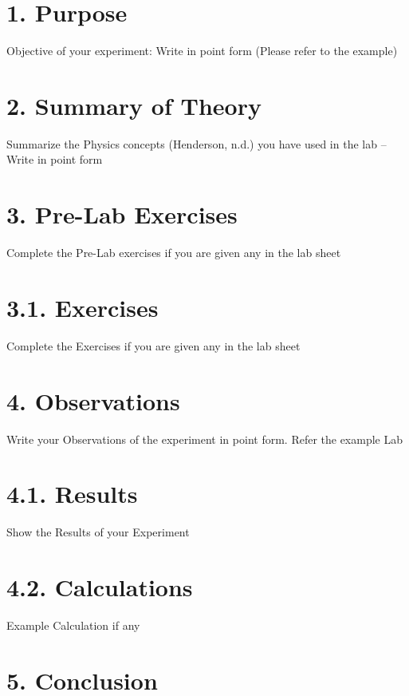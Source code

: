 \documentclass[a4paper,12pt]{article}
\begin{document}
\newpage
\vspace*{12pt}

\section*{1. Purpose}

Objective of your experiment: Write in point form (Please refer to the example)


\section*{2. Summary of Theory}

Summarize the Physics concepts (Henderson, n.d.) you have used in the lab – Write in point form


\section*{3. Pre-Lab Exercises}

Complete the Pre-Lab exercises if you are given any in the lab sheet


\section*{3.1. Exercises}

Complete the Exercises if you are given any in the lab sheet


\section*{4. Observations}

Write your Observations of the experiment in point form. Refer the example Lab


\section*{4.1. Results}

Show the Results of your Experiment


\section*{4.2. Calculations}

Example Calculation if  any


\section*{5. Conclusion}
\end{document}

